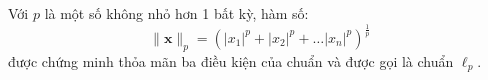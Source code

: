 \newpage Với $p$ {là một số không nhỏ hơn 1} bất kỳ, hàm số:
\begin{equation}
\label{eqn:normp}
\|\mathbf{x}\|_p = (|x_1|^p + |x_2|^p + \dots |x_n|^p)^{\frac{1}{p}}
\end{equation}
được chứng minh thỏa mãn ba điều kiện của chuẩn và được gọi là {chuẩn $\ell_p$}.
    



